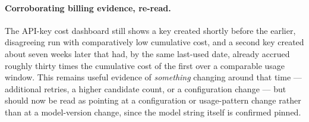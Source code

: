 \paragraph{Corroborating billing evidence, re-read.} The API-key cost
dashboard still shows a key created shortly before the earlier, disagreeing
run with comparatively low cumulative cost, and a second key created about
seven weeks later that had, by the same last-used date, already accrued
roughly thirty times the cumulative cost of the first over a comparable
usage window. This remains useful evidence of \emph{something} changing
around that time — additional retries, a higher candidate count, or a
configuration change — but should now be read as pointing at a
configuration or usage-pattern change rather than at a model-version
change, since the model string itself is confirmed pinned.

